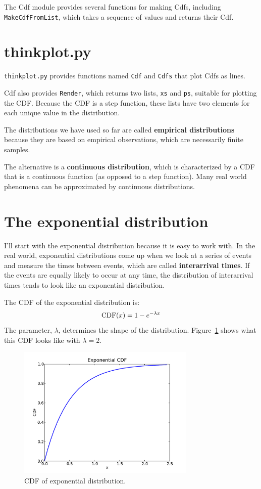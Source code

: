 \documentclass[12pt]{book}
\begin{document}
The Cdf module provides several functions for making Cdfs, including
{\tt MakeCdfFromList}, which takes a sequence of values
and returns their Cdf.

\section{thinkplot.py}

{\tt thinkplot.py} provides functions named {\tt Cdf} and
{\tt Cdfs} that plot Cdfs as lines.

Cdf also provides {\tt Render}, which returns two lists, {\tt xs} and
{\tt ps}, suitable for plotting the CDF.  Because the CDF is a
step function, these lists have two elements for each unique
value in the distribution.

The distributions we have used so far are called {\bf
  empirical distributions} because they are based on empirical
observations, which are necessarily finite samples.

The alternative is a {\bf continuous distribution}, which is
characterized by a CDF that is a continuous function (as opposed to a
step function).  Many real world phenomena can be approximated by
continuous distributions.

\section{The exponential distribution}

I'll start with the exponential distribution because it is
easy to work with.  In the real world, exponential distributions
come up when we look at a series of events and measure the
times between events, which are called {\bf interarrival times}.
If the events are equally likely to occur at any time, the distribution
of interarrival times tends to look like an exponential distribution.

The CDF of the exponential distribution is:
%
\[ \mathrm{CDF}(x) = 1 - e^{-\lambda x} \]
%
The parameter, $\lambda$, determines the shape of the
distribution.  Figure~\ref{expo_cdf} shows what this CDF looks like with
$\lambda = 2$.


\begin{figure}
\centerline{\includegraphics[height=2.5in]{figs/expo_cdf.pdf}}
\caption{CDF of exponential distribution.}
\label{expo_cdf}
\end{figure}
\end{document}
